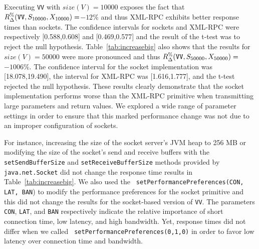 \documentclass{sig-alternate}
\begin{document}

Executing {\tt VV} with $size(V)=10000$ exposes the fact that
{\small$R_\Delta^\%(\mbox{{\tt VV}},S_{10000},X_{10000})=$}$-12\%$ and
thus XML-RPC exhibits better response times than sockets.  The
confidence intervals for sockets and XML-RPC were respectively
[0.588,0.608] and [0.469,0.577] and the result of the t-test was to
reject the null hypothesis.  Table~\ref{tab:increasebig} also shows
that the results for $size(V)=50000$ were more pronounced and thus
{\small$R_\Delta^\%(\mbox{{\tt VV}},S_{50000},X_{50000})=$}$-1006\%$.
The confidence interval for the socket implementation was
[18.078,19.490], the interval for XML-RPC was [1.616,1.777], and the
t-test rejected the null hypothesis.  These results clearly
demonstrate that the socket implementation performs worse than the
XML-RPC primitive when transmitting large parameters and return
values.  We explored a wide range of parameter settings in order to
ensure that this marked performance change was not due to an improper
configuration of sockets.




For instance, increasing the size of the socket server's JVM heap to
256 MB or modifying the size of the socket's send and receive buffers
with the {\tt setSendBufferSize} and {\tt setReceiveBufferSize}
methods provided by {\tt java.net.Socket} did not change the response
time results in Table~\ref{tab:increasebig}.  We also used the {\tt
  setPerformancePreferences(CON, LAT, BAN}) to modify the performance
preferences for the socket primitive and this did not change the
results for the socket-based version of {\tt VV}.  The parameters {\tt
  CON}, {\tt LAT}, and {\tt BAN} respectively indicate the relative
importance of short connection time, low latency, and high bandwidth.
Yet, response times did not differ when we called {\tt
  setPerformancePreferences(0,1,0)} in order to favor low latency over
connection time and bandwidth.
\end{document}
